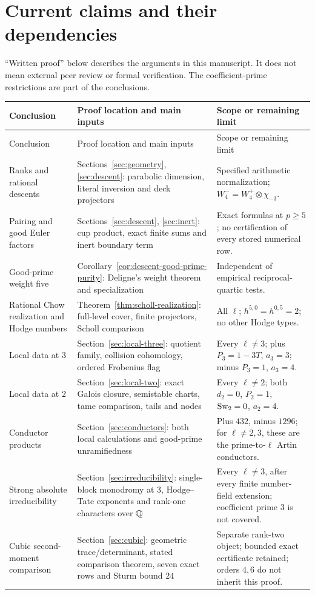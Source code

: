 \section{Current claims and their dependencies}\label{sec:claims}
``Written proof'' below describes the arguments in this manuscript.
It does not mean external peer review or formal verification. The
coefficient-prime restrictions are part of the conclusions.

\small
\begin{longtable}{>{\raggedright\arraybackslash}p{}>{\raggedright\arraybackslash}p{}>{\raggedright\arraybackslash}p{}}
\toprule
Conclusion & Proof location and main inputs & Scope or remaining limit\\
\midrule
\endfirsthead
\toprule Conclusion & Proof location and main inputs & Scope or remaining limit\\
\midrule\endhead
Ranks and rational descents & Sections~\ref{sec:geometry}, \ref{sec:descent}:
parabolic dimension, literal inversion and deck projectors &
Specified arithmetic normalization; $W_4^-=W_4^+\otimes\chi_{-3}$.\\[4pt]
Pairing and good Euler factors & Sections~\ref{sec:descent}, \ref{sec:inert}:
cup product, exact finite sums and inert boundary term &
Exact formulas at $p\ge5$; no certification of every stored numerical row.\\[4pt]
Good-prime weight five & Corollary~\ref{cor:descent-good-prime-purity}:
Deligne's weight theorem and specialization &
Independent of empirical reciprocal-quartic tests.\\[4pt]
Rational Chow realization and Hodge numbers &
Theorem~\ref{thm:scholl-realization}: full-level cover, finite projectors,
Scholl comparison & All $\ell$; $h^{5,0}=h^{0,5}=2$; no other Hodge types.\\[4pt]
Local data at $3$ & Section~\ref{sec:local-three}: quotient family,
collision cohomology, ordered Frobenius flag &
Every $\ell\ne3$; plus $P_3=1-3T$, $a_3=3$; minus $P_3=1$, $a_3=4$.\\[4pt]
Local data at $2$ & Section~\ref{sec:local-two}: exact Galois closure,
semistable charts, tame comparison, tails and nodes &
Every $\ell\ne2$; both $d_2=0$, $P_2=1$, $\operatorname{Sw}_2=0$, $a_2=4$.\\[4pt]
Conductor products & Section~\ref{sec:conductors}: both local
calculations and good-prime unramifiedness &
Plus $432$, minus $1296$; for $\ell\ne2,3$, these are the prime-to-$\ell$
Artin conductors.\\[4pt]
Strong absolute irreducibility & Section~\ref{sec:irreducibility}:
single-block monodromy at $3$, Hodge--Tate exponents and rank-one
characters over $\mathbb Q$ & Every $\ell\ne3$, after every finite
number-field extension; coefficient prime $3$ is not covered.\\[4pt]
Cubic second-moment comparison & Section~\ref{sec:cubic}:
geometric trace/determinant, stated comparison theorem, seven exact rows
and Sturm bound $24$ & Separate rank-two object; bounded exact
certificate retained; orders $4,6$ do not inherit this proof.\\
\bottomrule
\end{longtable}
\normalsize

